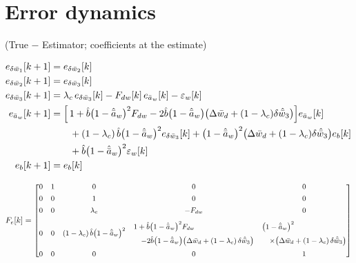\documentclass[11pt,a4paper,fontset=none]{ctexart}
\newcommand{\ba}{\bar{a}}
\newcommand{\bw}{\bar{w}}
\begin{document}
\section{Error dynamics}

(True $-$ Estimator; coefficients at the estimate)

\begin{align*}
e_{\delta\bw_1}[k+1] &= e_{\delta\bw_2}[k] \\
e_{\delta\bw_2}[k+1] &= e_{\delta\bw_3}[k] \\
e_{\delta\bw_3}[k+1] &= \lambda_c\,e_{\delta\bw_3}[k]
  - F_{dw}[k]\,e_{\ba_w}[k] - \varepsilon_w[k] \\
e_{\ba_w}[k+1] &= \Bigl[\,1
  + \hat{b}\bigl(1-\hat{\ba}_w\bigr)^{2}F_{dw}
  - 2\hat{b}\bigl(1-\hat{\ba}_w\bigr)
    \bigl(\Delta\bw_d + (1-\lambda_c)\delta\hat{\bw}_3\bigr)\Bigr] e_{\ba_w}[k] \\
  &\qquad + (1-\lambda_c)\,\hat{b}\bigl(1-\hat{\ba}_w\bigr)^{2}
      e_{\delta\bw_3}[k]
    + \bigl(1-\hat{\ba}_w\bigr)^{2}
      \bigl(\Delta\bw_d + (1-\lambda_c)\delta\hat{\bw}_3\bigr) e_b[k] \\
  &\qquad + \hat{b}\bigl(1-\hat{\ba}_w\bigr)^{2}\varepsilon_w[k] \\
e_b[k+1] &= e_b[k]
\end{align*}

\begin{equation*}
\small
F_e[k] =
\begin{bmatrix}
0 & 1 & 0 & 0 & 0 \\[0.4em]
0 & 0 & 1 & 0 & 0 \\[0.4em]
0 & 0 & \lambda_c & -F_{dw} & 0 \\[0.8em]
0 & 0 & (1-\lambda_c)\,\hat{b}\bigl(1-\hat{\ba}_w\bigr)^{2}
  & \begin{array}{@{}l@{}}
      1 + \hat{b}\bigl(1-\hat{\ba}_w\bigr)^{2}F_{dw} \\[0.6em]
      \quad - 2\hat{b}\bigl(1-\hat{\ba}_w\bigr)
        \bigl(\Delta\bw_d + (1-\lambda_c)\,\delta\hat{\bw}_3\bigr)
    \end{array}
  & \begin{array}{@{}l@{}}
      \bigl(1-\hat{\ba}_w\bigr)^{2} \\[0.6em]
      \quad \times \bigl(\Delta\bw_d + (1-\lambda_c)\,\delta\hat{\bw}_3\bigr)
    \end{array} \\[1.6em]
0 & 0 & 0 & 0 & 1
\end{bmatrix}
\end{equation*}
\end{document}
